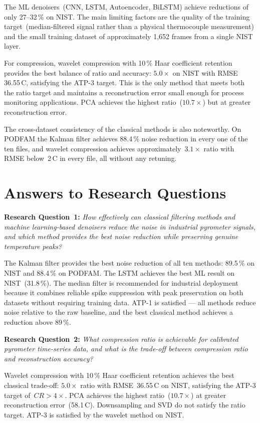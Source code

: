The ML denoisers~(CNN, LSTM, Autoencoder, BiLSTM) achieve reductions of only
27--32\,\% on NIST. The main limiting factors are the quality of the training
target~(median-filtered signal rather than a physical thermocouple measurement)
and the small training dataset of approximately 1,652 frames from a single NIST
layer.

For compression, wavelet compression with 10\,\% Haar coefficient retention
provides the best balance of ratio and accuracy: $5.0\times$ on NIST with RMSE
36.55\,\textdegree C, satisfying the ATP-3 target. This is the only method that
meets both the ratio target and maintains a reconstruction error small enough for
process monitoring applications. PCA achieves the highest ratio~($10.7\times$)
but at greater reconstruction error.

The cross-dataset consistency of the classical methods is also noteworthy. On
PODFAM the Kalman filter achieves 88.4\,\% noise reduction in every one of the
ten files, and wavelet compression achieves approximately~$3.1\times$ ratio with
RMSE below~2\,\textdegree C in every file, all without any retuning.

\section{Answers to Research Questions}
\label{sec:rq-answers}

\textbf{Research Question~1:} \textit{How effectively can classical filtering
methods and machine learning-based denoisers reduce the noise in industrial
pyrometer signals, and which method provides the best noise reduction while
preserving genuine temperature peaks?}

The Kalman filter provides the best noise reduction of all ten methods:
89.5\,\% on NIST and 88.4\,\% on PODFAM. The LSTM achieves the best ML result
on NIST~(31.8\,\%). The median filter is recommended for industrial deployment
because it combines reliable spike suppression with peak preservation on both
datasets without requiring training data. ATP-1 is satisfied --- all methods
reduce noise relative to the raw baseline, and the best classical method achieves
a reduction above 89\,\%.

\textbf{Research Question~2:} \textit{What compression ratio is achievable for
calibrated pyrometer time-series data, and what is the trade-off between
compression ratio and reconstruction accuracy?}

Wavelet compression with 10\,\% Haar coefficient retention achieves the best
classical trade-off: $5.0\times$ ratio with RMSE~36.55\,\textdegree C on NIST,
satisfying the ATP-3 target of~$CR > 4\times$. PCA achieves the highest
ratio~($10.7\times$) at greater reconstruction error~(58.1\,\textdegree C).
Downsampling and SVD do not satisfy the ratio target. ATP-3 is satisfied by
the wavelet method on NIST.

